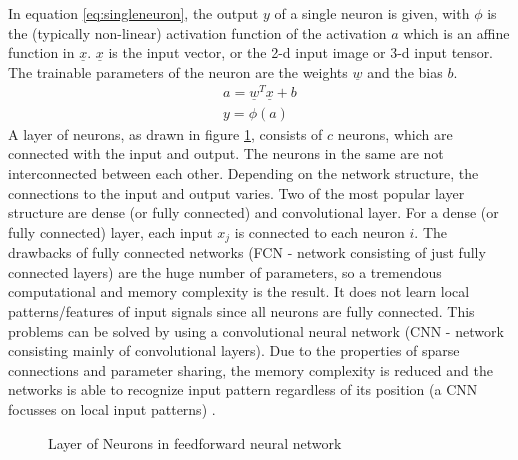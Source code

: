 \documentclass[12pt,DIV14,BCOR12mm,a4paper,footexclude,headinclude,halfparskip-,twoside,openright,cleardoubleempty,idxtotoc,bibtotoc,listtotoc]{scrreprt} %
\numberwithin{equation}{chapter}
\begin{document}
In equation \ref{eq:singleneuron}, the output $y$ of a single neuron is given, with $\phi$ is the (typically non-linear) activation function of the activation $a$ which is an affine function in $\underline{x}$. $\underline{x}$ is the input vector, or the 2-d input image or 3-d input tensor. The trainable parameters of the neuron are the weights $\underline{w}$ and the bias $b$.
\begin{align}
	a = \underline{w}{^T}\underline{x}+b\\
	y = \phi(a) \label{eq:singleneuron}
\end{align}
A layer of neurons, as drawn in figure \ref{fig:Layer_of_neurons}, consists of $c$ neurons, which are connected with the input and output. The neurons in the same are not interconnected between each other. Depending on the network structure, the connections to the input and output varies. Two of the most popular layer structure are dense (or fully connected) and convolutional layer. For a dense (or fully connected) layer, each input $x_{j}$ is connected to each neuron $i$. The drawbacks of fully connected networks (FCN - network consisting of just fully connected layers) are the huge number of parameters, so a tremendous computational and memory complexity is the result. It does not learn local patterns/features of input signals since all neurons are fully connected. This problems can be solved by using a convolutional neural network (CNN - network consisting mainly of convolutional layers). Due to the properties of sparse connections and parameter sharing, the memory complexity is reduced and the networks is able to recognize input pattern regardless of its position (a CNN focusses on local input patterns) \cite{LectureNotes_DeepLearning}.
\begin{figure}[htb!]
	\centering
	\qquad
	\caption{Layer of Neurons in feedforward neural network}
	\label{fig:Layer_of_neurons}
\end{figure}
\end{document}
